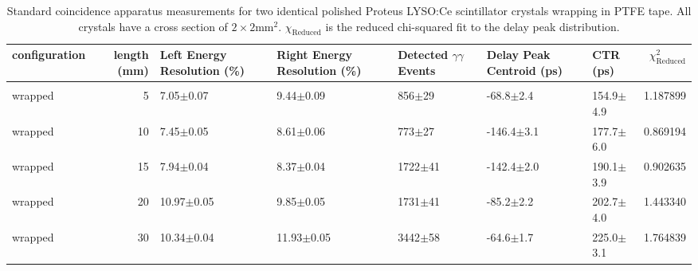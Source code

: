 \begin{table}
\caption{\label{tab:standardctr} Standard coincidence apparatus measurements for two identical polished Proteus LYSO:Ce scintillator crystals wrapping in PTFE tape. All crystals have a cross section of $2\times2$mm$^2$. $\chi_\text{Reduced}$ is the reduced chi-squared fit to the delay peak distribution.}
\begin{tabular}{lrlllllr}
configuration &  length (mm) & Left Energy Resolution (\%) & Right Energy Resolution (\%) & Detected $\gamma\gamma$ Events & Delay Peak Centroid (ps) & CTR (ps) &  $\chi^2_\text{Reduced}$ \\
\hline
              &         &                      &                  &              &                 &                &             \\
      wrapped &       5 &        7.05$\pm$0.07 &    9.44$\pm$0.09 &   856$\pm$29 &   -68.8$\pm$2.4 &  154.9$\pm$4.9 &    1.187899 \\
      wrapped &      10 &        7.45$\pm$0.05 &    8.61$\pm$0.06 &   773$\pm$27 &  -146.4$\pm$3.1 &  177.7$\pm$6.0 &    0.869194 \\
      wrapped &      15 &        7.94$\pm$0.04 &    8.37$\pm$0.04 &  1722$\pm$41 &  -142.4$\pm$2.0 &  190.1$\pm$3.9 &    0.902635 \\
      wrapped &      20 &       10.97$\pm$0.05 &    9.85$\pm$0.05 &  1731$\pm$41 &   -85.2$\pm$2.2 &  202.7$\pm$4.0 &    1.443340 \\
      wrapped &      30 &       10.34$\pm$0.04 &   11.93$\pm$0.05 &  3442$\pm$58 &   -64.6$\pm$1.7 &  225.0$\pm$3.1 &    1.764839 \\
\hline
\end{tabular}
\end{table}
